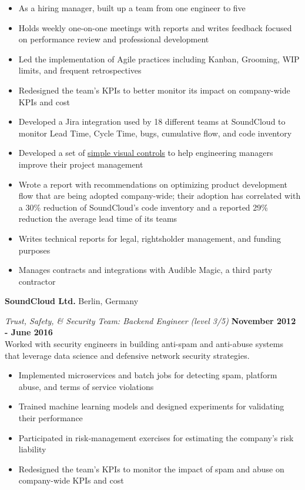 \documentclass[margin,line]{res}
\newenvironment{list1}{
  \begin{list}{\ding{113}}{%
      \setlength{\itemsep}{0in}
      \setlength{\parsep}{0in} \setlength{\parskip}{0in}
      \setlength{\topsep}{0in} \setlength{\partopsep}{0in}
      \setlength{\leftmargin}{0.17in}}}{\end{list}}
\begin{document}
\begin{resume}
\begin{list1}
\begin{itemize}
\item As a hiring manager, built up a team from one engineer to five
\item Holds weekly one-on-one meetings with reports and writes feedback focused on performance review and professional development
\item Led the implementation of Agile practices including Kanban, Grooming, WIP limits, and frequent retrospectives
\item Redesigned the team's KPIs to better monitor its impact on company-wide KPIs and cost
\item Developed a Jira integration used by 18 different teams at SoundCloud to monitor Lead Time, Cycle Time, bugs, cumulative flow, and code inventory
\item Developed a set of \href{https://en.wikipedia.org/wiki/Visual_control}{simple visual controls} to help engineering managers improve their project management
\item Wrote a report with recommendations on optimizing product development flow that are being adopted company-wide; their adoption has correlated with a 30\% reduction of SoundCloud's code inventory and a reported 29\% reduction the average lead time of its teams
\item Writes technical reports for legal, rightsholder management, and funding purposes
\item Manages contracts and integrations with Audible Magic, a third party contractor
\end{itemize}

\end{list1}

{\bf SoundCloud Ltd.} Berlin, Germany\\
\vspace*{-.1in}
\begin{list1}
\item[] {\em Trust, Safety, \& Security Team: Backend Engineer (level 3/5)} \hfill {\bf November 2012 - June 2016}\\
Worked with security engineers in building anti-spam and anti-abuse systems that leverage data science and defensive network security strategies.

\begin{itemize}
\item Implemented microservices and batch jobs for detecting spam, platform abuse, and terms of service violations
\item Trained machine learning models and designed experiments for validating their performance
\item Participated in risk-management exercises for estimating the company's risk liability
\item Redesigned the team's KPIs to monitor the impact of spam and abuse on company-wide KPIs and cost
\end{itemize}


\end{list1}
\end{resume}
\end{document}
